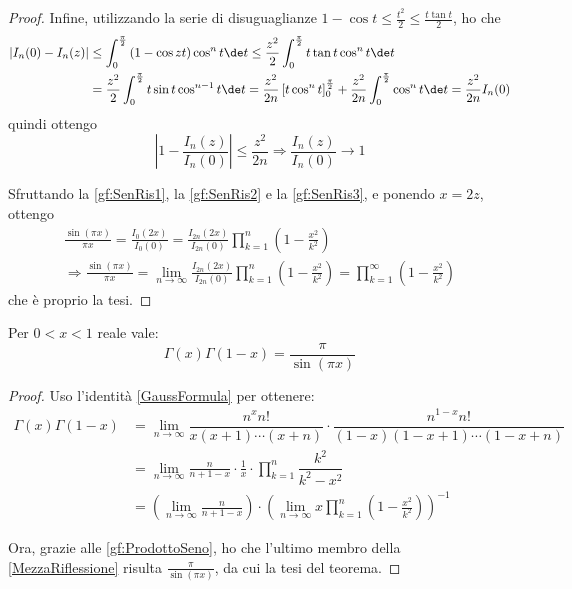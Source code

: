 \begin{proof}
	Infine, utilizzando la serie di disuguaglianze $\displaystyle 1-\cos t\le \frac{t^2}{2} \le \frac{t\tan t}{2}$, ho che
	\begin{align*}
		|I_n(0)-I_n(z)|	& \le \int_0^{\frac{\pi}2}{(1-\cos{zt})\cos^nt \de t}\le \frac{z^2}{2}\int_0^{\frac{\pi}2}{t\tan t \cos^nt \de t}\\
						& =\frac{z^2}{2}\int_0^{\frac{\pi}2}{t\sin t \cos^{n-1}t \de t}=\frac{z^2}{2n}\left[ t\cos^nt \right]_0^{\frac{\pi}2}+\frac{z^2}{2n}\int_0^{\frac{\pi}2}{\cos^nt \de t}=\frac{z^2}{2n}I_n(0)
	\end{align*}
	quindi ottengo
	\begin{equation} \label{gf:SenRis3}
		\left| 1-\frac{I_n(z)}{I_n(0)} \right|\le \frac{z^2}{2n} \Longrightarrow \frac{I_n(z)}{I_n(0)}\to 1
	\end{equation}
	
	Sfruttando la \cref{gf:SenRis1}, la \cref{gf:SenRis2} e la \cref{gf:SenRis3}, e ponendo $x=2z$, ottengo
	\begin{gather*}
		\frac{\sin(\pi x)}{\pi x}=\frac{I_0(2x)}{I_0(0)}=\frac{I_{2n}(2x)}{I_{2n}(0)}\prod_{k=1}^{n}\left( 1-\frac{x^2}{k^2} \right) \\
		\Longrightarrow \frac{\sin(\pi x)}{\pi x}=\lim_{n\to\infty} \frac{I_{2n}(2x)}{I_{2n}(0)}\prod_{k=1}^{n}\left( 1-\frac{x^2}{k^2} \right) = \prod_{k=1}^{\infty}\left( 1-\frac{x^2}{k^2} \right)
	\end{gather*}
	che è proprio la tesi.



\end{proof}



\begin{theorem} \label{Riflessione}
	Per $0<x<1$ reale vale:
	\begin{equation*}
		\Gamma(x)\Gamma(1-x)=\frac{\pi}{\sin(\pi x)}
	\end{equation*}
\end{theorem}
\begin{proof}
	Uso l'identità \cref{GaussFormula} per ottenere:
	\begin{equation}\begin{split} \label{MezzaRiflessione}
		\Gamma(x)\Gamma(1-x) & = \lim_{n\to\infty} \dfrac{n^xn!}{x(x+1)\cdots (x+n)} \cdot 
		\dfrac{n^{1-x}n!}{(1-x)(1-x+1)\cdots (1-x+n)}\\
		& =\lim_{n\to\infty} \frac{n}{n+1-x} \cdot \frac{1}{x} \cdot \prod_{k=1}^{n}\dfrac{k^2}{k^2-x^2} \\
		& =\left(\lim_{n\to\infty} \frac{n}{n+1-x} \right) \cdot 
		\left( \lim_{n\to\infty} x \prod_{k=1}^{n}\left(1-\frac{x^2}{k^2}\right) \right)^{-1}
	\end{split}\end{equation}

	Ora, grazie alle \cref{gf:ProdottoSeno}, ho che l'ultimo membro della \cref{MezzaRiflessione} risulta $\frac{\pi}{\sin(\pi x)}$, da cui la tesi del teorema.
\end{proof}

